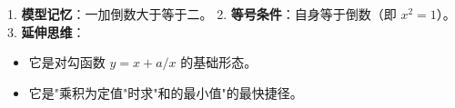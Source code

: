 \begin{summarybox}
1. \textbf{模型记忆}：一加倒数大于等于二。
2. \textbf{等号条件}：自身等于倒数（即 $x^2=1$）。
3. \textbf{延伸思维}：
    \begin{itemize}
        \item 它是对勾函数 $y=x+a/x$ 的基础形态。
        \item 它是"乘积为定值"时求"和的最小值"的最快捷径。
    \end{itemize}
\end{summarybox}